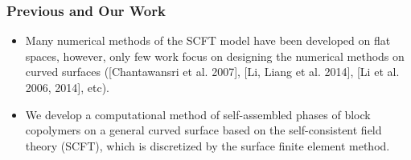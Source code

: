 \documentclass[notheorems,serif]{beamer}
\begin{document}
\begin{frame}
\begin{figure}
    \hspace{0.5cm}
\end{figure}


\end{frame}


\begin{frame}
\frametitle{ Previous and Our Work}
    \begin{itemize}

\item Many numerical methods of the SCFT model have been developed on flat
    spaces, however, only few work focus on designing the numerical methods on
            curved surfaces ([Chantawansri et al. 2007], [Li, Liang et al. 2014], [Li et al. 2006, 2014], etc).

\medskip
    
\item We develop a computational method of self-assembled phases of block
    copolymers on a general curved surface based on the self-consistent
            field theory (SCFT), which is discretized by the surface finite element
            method.
\end{itemize}
\end{frame}



\begin{frame}
\end{frame}
\end{document}
